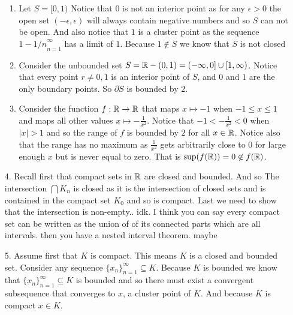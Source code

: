 \documentclass[12pt]{amsart}
\begin{document}
\begin{itemize}
\begin{enumerate}
            \item Let $S=[0,1)$ Notice that $0$ is not an interior point as for any $\epsilon>0$
                  the open set $(-\epsilon,\epsilon)$ will always contain negative numbers and so
                  $S$ can not be open. And also notice that $1$ is a cluster point as the
                  sequence ${1-1/n}_{n=1}^\infty$ has a limit of $1$. Because $1\not\in S$ we
                  know that $S$ is not closed

            \item Consider the unbounded set $S=\mathbb{R}-(0,1)=(-\infty,0]\cup [1,\infty)$. Notice that
                  every point $r\neq 0,1$ is an interior point of $S$, and $0$ and $1$ are the
                  only boundary points. So $\partial S$ is bounded by $2$.

            \item Consider the function $f:\mathbb{R}\rightarrow\mathbb{R}$ that maps $x\mapsto -1$ when $-1\leq x\leq 1$
                  and maps all other values $x\mapsto -\frac{1}{x^2}$. Notice that
                  $-1<-\frac{1}{x^2}<0$ when $|x|>1$ and so the range of $f$ is bounded by $2$
                  for all $x\in \mathbb{R}$. Notice also that the range has no maximum as $\frac{1}{x^2}$
                  gets arbitrarily close to $0$ for large enough $x$ but is never equal to zero.
                  That is $\sup(f(\mathbb{R}))=0\not\in f(\mathbb{R})$.
        \end{enumerate}

    \item[4.] Recall first that compact sets in $\mathbb{R}$ are closed and bounded. And so The
        intersection $\bigcap K_n$ is closed as it is the intersection of closed sets
        and is contained in the compact set $K_0$ and so is compact. Last we need to
        show that the intersection is non-empty.. idk. I think you can say every
        compact set can be written as the union of of its connected parts which are all
        intervals. then you have a nested interval theorem. maybe

    \item[5.] Assume first that $K$ is compact. This means $K$ is a closed and bounded set.
        Consider any sequence $\{x_n\}_{n=1}^\infty\subseteq K$. Because $K$ is bounded we
        know that $\{x_n\}_{n=1}^\infty\subseteq K$ is bounded and so there must exist a
        convergent subsequence that converges to $x$, a cluster point of $K$. And
        because $K$ is compact $x\in K$.


\end{itemize}
\end{document}
